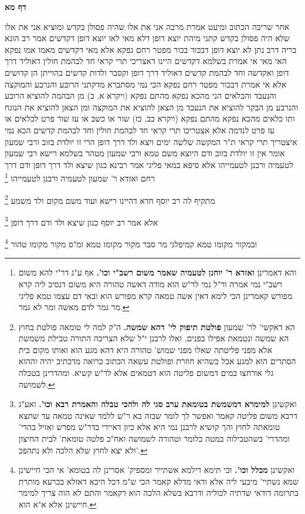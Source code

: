 \documentclass[12pt, openany]{book}
\newcommand{\sethebfont}{
\fontsize{10.5pt}{21.0pt} \selectfont
}
\newcommand{\twocol}[1]{
	{\sethebfont \begin{multicols}{2}
			#1
	\end{multicols}}	
}
\newcommand{\sectname}{}
\newcommand{\newsection}[1]{
	\addcontentsline{toc}{section}{#1}
	\renewcommand{\sectname}{#1}	
	\vspace{-\baselineskip}
	\begin{center}
		\textbf{%
\fontsize{16pt}{16pt}\selectfont
			#1}
	\end{center}
	\vspace{-\baselineskip}
	\nopagebreak
}
\newcommand{\footnotecomment}[1]{\footnote{#1}}
\newcommand{\commenta}[1]{\footnotecomment{#1}}
\begin{document}
\newsection{דף מא}
\twocol{אחר שריבה הכתוב ומיעט  אמרת  מרבה אני את אלו שהיה פסולן בקדש ומוציא אני את אלו שלא היה פסולן בקדש 
קתני מיהת יוצא דופן דלא מאי לאו יוצא דופן דקדשים  אמר רב הונא בריה דרב נתן  לא יוצא דופן דבכור 
בכור מפטר רחם נפקא 
אלא מאי דקדשים  מאמו אמו נפקא 
האי מאי אי אמרת בשלמא דקדשים היינו דאצריכי תרי קראי חד לבהמת חולין דאוליד דרך דופן ואקדשה
וחד לבהמת קדשים דאוליד דרך דופן וקסבר ולדות קדשים בהוייתן הן קדושים  אלא אי אמרת דבכור מפטר רחם נפקא 
הכי נמי מסתברא מדקתני הרובע והנרבע והמוקצה והנעבד והכלאים
הני מהכא נפקא  מהתם נפקא  (ויקרא א, ב) מן הבהמה להוציא הרובע והנרבע  מן הבקר להוציא את הנעבד  מן הצאן להוציא את המוקצה  ומן הצאן להוציא את הנוגח 
ותו כלאים מהכא נפקא  מהתם נפקא (ויקרא כב, כז) שור או כשב או עז  שור פרט לכלאים או עז פרט לנדמה 
אלא  אצטריכו תרי קראי חד לבהמת חולין וחד לבהמת קדשים הכא נמי איצטריך תרי קראי 
ת"ר  המקשה שלשה ימים ויצא ולד דרך דופן הרי זו יולדת בזוב ורבי שמעון אומר  אין זו יולדת בזוב  ודם היוצא משם טמא ורבי שמעון מטהר 
בשלמא רישא רבי שמעון לטעמיה ורבנן לטעמייהו אלא סיפא במאי פליגי  אמר רבינא  כגון שיצא ולד דרך דופן
ודם דרך רחם ואזדא ר' שמעון לטעמיה ורבנן לטעמייהו 
\commenta{והא דאמרינן \textbf{ואזדא ר' יוחנן לטעמיה שאמר משום רשב"י וכו'.}  אף ע"ג דר"י להא משום רשב"י נמי אמרה ור"ל נמי לר"ש הוא מודה דאשה טהורה היא משום דנסיב ליה קרא מפורש קאמרינן הכי לימא דאין אשה טמאה קרא מפורש הוא ובאי דם עצמו טמא פליגי מר גמר לדם מאשה ומר לא גמר. }

מתקיף לה רב יוסף  חדא דהיינו רישא ועוד משם מקום ולד משמע 
\commenta{הא דאקשי' לר' שמעון \textbf{פולטת תיפוק לי' דהא שמשה.}  ה"ק למה לי טומאה פולטת בחוץ הא שמשה ונטמאת אפילו בפנים, ואלו לרבנן י"ל שלא הצריכה התורה טבילת משמשת אלא מפני פליטתה שאלו מפני שמוש' טהורה היא דהא מגע הוא ואותו מקום בית הסתרים הוא למגע אבל כשהיא חוזרת ופולטת עשאה הכתוב כרואה מדכתיב יהיה וההוא גלי אורחצו במים דמשום פליטה הוא דטמאים אלא לר"ש קשיא. ומהדרינן בטבלה לשמושה. }

אלא אמר רב יוסף  כגון שיצא ולד ודם דרך דופן
\commenta{ואקשינן \textbf{למימרא דמשמשת בטומאת ערב סגי לה ולהכי טבלה והאמרת רבא וכו'.}  ואע"ג דרבא משום פליטה קאמר ואפשר לך לומר שבזה בא ר"ש ללמד שאינה טמאה עד שתצא טומאתה לחוץ והך קושיא לרבנן נמי היא אלא כיון דאיירי בדר"ש מפרש ואזיל בהדי' ומהדרי' בשהטבילוה במטה כלומר וטהורה לשמושה ואח"כ פלטה טומאת' לבית החיצון ולא יצא לחוץ שלא הלכה ולא נתהפכ'. }

ובמקור מקומו טמא קמיפלגי מר סבר מקור מקומו טמא ומ"ס מקור מקומו טהור 
\commenta{ואקשינן \textbf{מכלל וכו'.}  וכי תימא דילמא אשתייר ומספיק' אסרינן לה בטומא' אי הכי חיישינן שמא נשתיי' מיבעי ליה אלא ודאי מדלא קאמר הכי ש"מ דכל היכא דאזלא בכרעא מותרת בתרומה דודאי שדתיה לכוליה ודרבא בשלא הלכה הוא דקאמר והתם לא הוה צריך למימר חיישינן אלא א"א הוא. }

}
\end{document}
